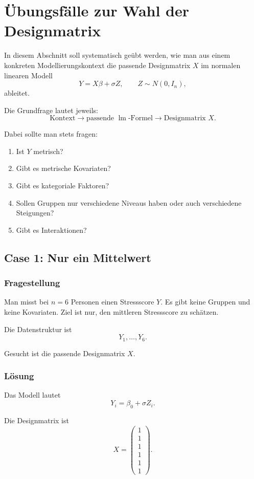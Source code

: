 \documentclass[10pt, letterpaper]{article}
\begin{document}
\pagebreak


\section{Übungsfälle zur Wahl der Designmatrix}

In diesem Abschnitt soll systematisch geübt werden, wie man aus einem konkreten Modellierungskontext die passende Designmatrix \(X\) im normalen linearen Modell
\[
Y=X\beta+\sigma Z,
\qquad Z\sim N(0,I_n),
\]
ableitet.

Die Grundfrage lautet jeweils:
\[
\text{Kontext}
\longrightarrow
\text{passende } \operatorname{lm}\text{-Formel}
\longrightarrow
\text{Designmatrix }X.
\]

Dabei sollte man stets fragen:
\begin{enumerate}
    \item Ist \(Y\) metrisch?
    \item Gibt es metrische Kovariaten?
    \item Gibt es kategoriale Faktoren?
    \item Sollen Gruppen nur verschiedene Niveaus haben oder auch verschiedene Steigungen?
    \item Gibt es Interaktionen?
\end{enumerate}

\subsection{Case 1: Nur ein Mittelwert}

\subsubsection*{Fragestellung}

Man misst bei \(n=6\) Personen einen Stressscore \(Y\). Es gibt keine Gruppen und keine Kovariaten. Ziel ist nur, den mittleren Stressscore zu schätzen.

Die Datenstruktur ist
\[
Y_1,\dots,Y_6.
\]

Gesucht ist die passende Designmatrix \(X\).

\subsubsection*{Lösung}

Das Modell lautet
\[
Y_i=\beta_0+\sigma Z_i.
\]

Die Designmatrix ist
\[
X=
\begin{pmatrix}
1\\
1\\
1\\
1\\
1\\
1
\end{pmatrix}.
\]
\end{document}

